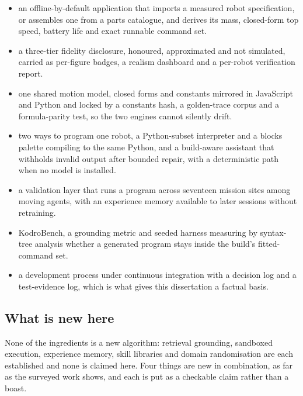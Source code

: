\documentclass[11pt,a4paper]{report}
\begin{document}
\begin{itemize}
\item {} an offline-by-default application that imports a measured robot specification, or assembles one from a parts catalogue, and derives its mass, closed-form top speed, battery life and exact runnable command set.
\item a three-tier fidelity disclosure, honoured, approximated and not simulated, carried as per-figure badges, a realism dashboard and a per-robot verification report.
\item {} one shared motion model, closed forms and constants mirrored in JavaScript and Python and locked by a constants hash, a golden-trace corpus and a formula-parity test, so the two engines cannot silently drift.
\item {} two ways to program one robot, a Python-subset interpreter and a blocks palette compiling to the same Python, and a build-aware assistant that withholds invalid output after bounded repair, with a deterministic path when no model is installed.
\item a validation layer that runs a program across seventeen mission sites among moving agents, with an experience memory available to later sessions without retraining.
\item KodroBench, a grounding metric and seeded harness measuring by syntax-tree analysis whether a generated program stays inside the build's fitted-command set.
\item a development process under continuous integration with a decision log and a test-evidence log, which is what gives this dissertation a factual basis.
\end{itemize}

\subsection{What is new here}
None of the ingredients is a new algorithm: retrieval grounding, sandboxed execution, experience memory, skill libraries and domain randomisation are each established and none is claimed here. Four things are new in combination, as far as the surveyed work shows, and each is put as a checkable claim rather than a boast.
\end{document}
